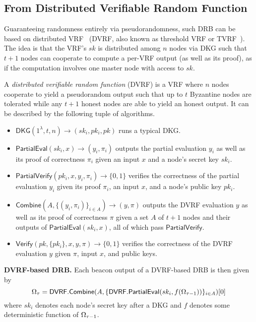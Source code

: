 \subsection{From Distributed Verifiable Random Function}
Guaranteeing randomness entirely via pseudorandomness, such DRB can be based on distributed VRF~\cite{groth2021non,camenisch2022internet,galindo2020fully} (DVRF, also known as threshold VRF or TVRF~\cite{cascudomt}). The idea is that the VRF's $sk$ is distributed among $n$ nodes via DKG such that $t + 1$ nodes can cooperate to compute a per-\epoch VRF output (as well as its proof), as if the computation involves one master node with access to $sk$.

\begin{definition}
A \textit{distributed verifiable random function} (DVRF) is a VRF where $n$ nodes cooperate to yield a pseudorandom output such that up to $t$ Byzantine nodes are tolerated while any $t + 1$ honest nodes are able to yield an honest output. It can be described by the following tuple of algorithms.
\begin{itemize}
\item $\mathsf{DKG}(1^\lambda, t, n) \rightarrow (sk_i, pk_i, pk)$ runs a typical DKG.
\item $\mathsf{PartialEval}(sk_i, x) \rightarrow (y_i, \pi_i)$ outputs the partial evaluation $y_i$ as well as its proof of correctness $\pi_i$ given an input $x$ and a node's secret key $sk_i$.
\item $\mathsf{PartialVerify}(pk_i, x, y_i, \pi_i) \rightarrow \{0, 1\}$ verifies the correctness of the partial evaluation $y_i$ given its proof $\pi_i$, an input $x$, and a node's public key $pk_i$.
\item $\mathsf{Combine}(A, \{(y_i, \pi_i)\}_{i \in A}) \rightarrow (y, \pi)$ outputs the DVRF evaluation $y$ as well as its proof of correctness $\pi$ given a set $A$ of $t + 1$ nodes and their outputs of $\mathsf{PartialEval}(sk_i, x)$, all of which pass $\mathsf{PartialVerify}$.
\item $\mathsf{Verify}(pk, \{pk_i\}, x, y, \pi) \rightarrow \{0, 1\}$ verifies the correctness of the DVRF evaluation $y$ given $\pi$, input $x$, and public keys.
\end{itemize}
\end{definition}

\noindent\textbf{DVRF-based DRB.} Each beacon output of a DVRF-based DRB is then given by
\begingroup\makeatletter\def\f@size{8}\check@mathfonts
\[
\Omega_\tau = \mathsf{DVRF.Combine}(A, \{\mathsf{DVRF.PartialEval}(sk_i, f(\Omega_{\tau - 1}))\}_{i \in A})[0]
\]\endgroup
where $sk_i$ denotes each node's secret key after a DKG and $f$ denotes some deterministic function of $\Omega_{\tau - 1}$.

